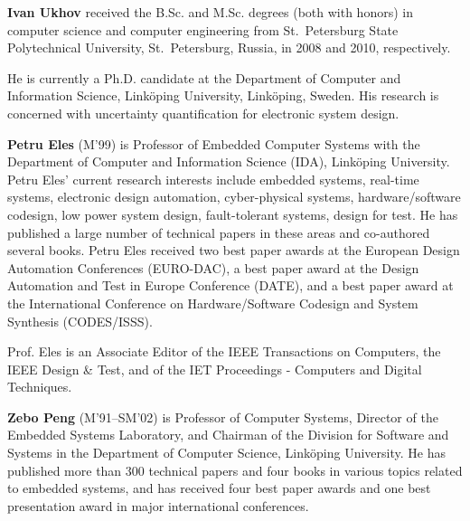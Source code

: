 \newenvironment{biography}{\vspace{1em}\footnotesize}{\relax\par\normalfont}

\begin{biography}
\noindent\textbf{Ivan Ukhov} received the B.Sc. and M.Sc. degrees (both with honors) in computer science and computer engineering from St.~Petersburg State Polytechnical University, St.~Petersburg, Russia, in 2008 and 2010, respectively.

He is currently a Ph.D. candidate at the Department of Computer and Information Science, Link\"{o}ping University, Link\"{o}ping, Sweden.
His research is concerned with uncertainty quantification for electronic system design.
\end{biography}

\begin{biography}
\noindent\textbf{Petru Eles} (M'99) is Professor of Embedded Computer Systems with the Department of Computer and Information Science (IDA), Link\"{o}ping University.
Petru Eles' current research interests include embedded systems, real-time systems, electronic design automation, cyber-physical systems, hardware/software codesign, low power system design, fault-tolerant systems, design for test.
He has published a large number of technical papers in these areas and co-authored several books.
Petru Eles received two best paper awards at the European Design Automation Conferences (EURO-DAC), a best paper award at the Design Automation and Test in Europe Conference (DATE), and a best paper award at the International Conference on Hardware/Software Codesign and System Synthesis (CODES/ISSS).

Prof. Eles is an Associate Editor of the IEEE Transactions on Computers, the IEEE Design \& Test, and of the IET Proceedings - Computers and Digital Techniques.
\end{biography}

\begin{biography}
\noindent\textbf{Zebo Peng} (M'91--SM'02) is Professor of Computer Systems, Director of the Embedded Systems Laboratory, and Chairman of the Division for Software and Systems in the Department of Computer Science, Link\"{o}ping University.
He has published more than 300 technical papers and four books in various topics related to embedded systems, and has received four best paper awards and one best presentation award in major international conferences.
\end{biography}
